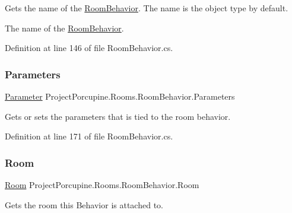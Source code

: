 Gets the name of the \hyperlink{class_project_porcupine_1_1_rooms_1_1_room_behavior}{Room\+Behavior}. The name is the object type by default. 

The name of the \hyperlink{class_project_porcupine_1_1_rooms_1_1_room_behavior}{Room\+Behavior}.

Definition at line 146 of file Room\+Behavior.\+cs.

\mbox{\label{class_project_porcupine_1_1_rooms_1_1_room_behavior_a96a65a8b1a6df3f917b693e996eba5a1}} 
\subsubsection{\texorpdfstring{Parameters}{Parameters}}
{\footnotesize\ttfamily \hyperlink{class_parameter}{Parameter} Project\+Porcupine.\+Rooms.\+Room\+Behavior.\+Parameters\hspace{0.3cm}{\ttfamily [get]}}



Gets or sets the parameters that is tied to the room behavior. 



Definition at line 171 of file Room\+Behavior.\+cs.

\mbox{\label{class_project_porcupine_1_1_rooms_1_1_room_behavior_af4e0d68fcb704cb98fe634e7e1847760}} 
\subsubsection{\texorpdfstring{Room}{Room}}
{\footnotesize\ttfamily \hyperlink{class_project_porcupine_1_1_rooms_1_1_room}{Room} Project\+Porcupine.\+Rooms.\+Room\+Behavior.\+Room\hspace{0.3cm}{\ttfamily [get]}}



Gets the room this Behavior is attached to. 



